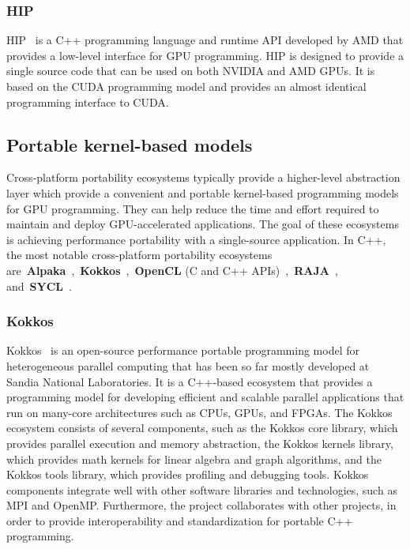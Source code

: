 \subsubsection{HIP}


\par
HIP~\cite{hip} is a C++ programming language and runtime API developed by AMD that provides a low-level interface for GPU programming.
HIP is designed to provide a single source code that can be used on both NVIDIA and AMD GPUs.
It is based on the CUDA programming model and provides an almost identical programming interface to CUDA.




\subsection{Portable kernel-based models}

\par
Cross-platform portability ecosystems typically provide a higher-level abstraction layer which provide a convenient and portable kernel-based programming models for GPU programming.
They can help reduce the time and effort required to maintain and deploy GPU-accelerated applications.
The goal of these ecosystems is achieving performance portability with a single-source application.
In C++, the most notable cross-platform portability ecosystems are~\textbf{Alpaka}~\cite{alpaka},~\textbf{Kokkos}~\cite{kokkos},~\textbf{OpenCL} (C and C++ APIs)~\cite{OpenCL},~\textbf{RAJA}~\cite{raja}, and~\textbf{SYCL}~\cite{sycl}.


\subsubsection{Kokkos}


\par
Kokkos~\cite{kokkos} is an open-source performance portable programming model for heterogeneous parallel computing that has been so far mostly developed at Sandia National Laboratories.
It is a C++-based ecosystem that provides a programming model for developing efficient and scalable parallel applications that run on many-core architectures such as CPUs, GPUs, and FPGAs.
The Kokkos ecosystem consists of several components, such as the Kokkos core library, which provides parallel execution and memory abstraction, the Kokkos kernels library, which provides math kernels for linear algebra and graph algorithms, and the Kokkos tools library, which provides profiling and debugging tools.
Kokkos components integrate well with other software libraries and technologies, such as MPI and OpenMP. 
Furthermore, the project collaborates with other projects, in order to provide interoperability and standardization for portable C++ programming.


